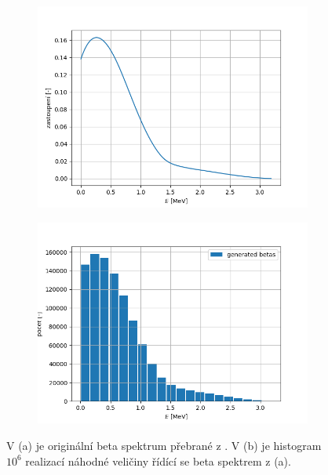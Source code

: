 \documentclass[11pt,a4paper]{article}
\begin{document}
\begin{figure}[H]
	\centering
	\begin{subfigure}{0.49\textwidth}
		\centering
		\includegraphics[width=.99\textwidth]{betaSpektrum_Bi.png}
		\caption{}
	\end{subfigure}
	\begin{subfigure}{0.49\textwidth}
		\centering
		\includegraphics[width=.99\textwidth]{betaNahodnaCisla_Bi.png}
		\caption{}
	\end{subfigure}
	\caption{V (a) je originální beta spektrum  přebrané z \cite{betaSpektrum}. V (b) je histogram $10^6$ realizací náhodné veličiny řídící se beta spektrem z (a).}
\end{figure}
\end{document}
